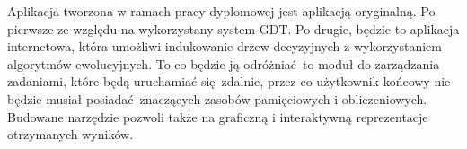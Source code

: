 Aplikacja tworzona w ramach pracy dyplomowej jest aplikacją oryginalną. Po pierwsze ze względu na wykorzystany system GDT. Po drugie, będzie to aplikacja internetowa, która umożliwi indukowanie drzew decyzyjnych z wykorzystaniem algorytmów ewolucyjnych. To co będzie ją odróżniać to moduł do zarządzania zadaniami, które będą uruchamiać się zdalnie, przez co użytkownik końcowy nie będzie musiał posiadać znaczących zasobów pamięciowych i obliczeniowych. Budowane narzędzie pozwoli także na graficzną i interaktywną reprezentacje otrzymanych wyników.
